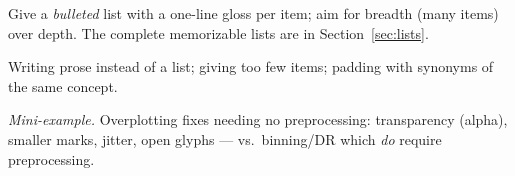 \begin{exambox}
Give a \emph{bulleted} list with a one-line gloss per item; aim for breadth
(many items) over depth. The complete memorizable lists are in
Section~\ref{sec:lists}.
\end{exambox}

\begin{pitfall}
Writing prose instead of a list; giving too few items; padding with synonyms of
the same concept.
\end{pitfall}

\textit{Mini-example.} Overplotting fixes needing no preprocessing:
transparency (alpha), smaller marks, jitter, open glyphs --- vs.\ binning/DR
which \emph{do} require preprocessing.

